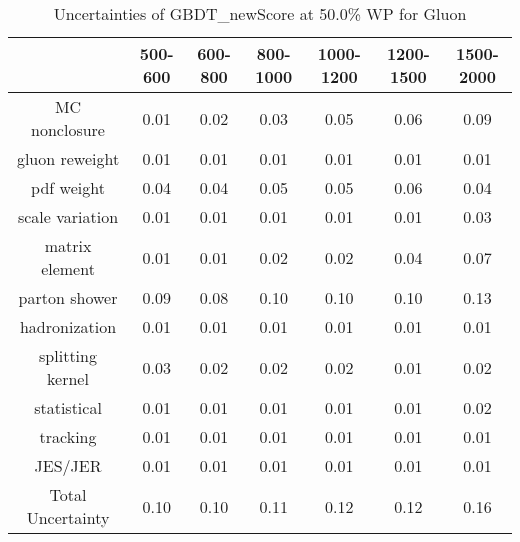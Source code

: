\begin{table}
\centering
\caption{Uncertainties of GBDT_newScore at 50.0\% WP for Gluon}
\label{tab:syst_GBDT_newScore_0.5_Gluon}
\begin{tabular}{ccccccc}
\toprule
{} &  500-600 &  600-800 &  800-1000 &  1000-1200 &  1200-1500 &  1500-2000 \\
\midrule
MC nonclosure     &     0.01 &     0.02 &      0.03 &       0.05 &       0.06 &       0.09 \\
gluon reweight    &     0.01 &     0.01 &      0.01 &       0.01 &       0.01 &       0.01 \\
pdf weight        &     0.04 &     0.04 &      0.05 &       0.05 &       0.06 &       0.04 \\
scale variation   &     0.01 &     0.01 &      0.01 &       0.01 &       0.01 &       0.03 \\
matrix element    &     0.01 &     0.01 &      0.02 &       0.02 &       0.04 &       0.07 \\
parton shower     &     0.09 &     0.08 &      0.10 &       0.10 &       0.10 &       0.13 \\
hadronization     &     0.01 &     0.01 &      0.01 &       0.01 &       0.01 &       0.01 \\
splitting kernel  &     0.03 &     0.02 &      0.02 &       0.02 &       0.01 &       0.02 \\
statistical       &     0.01 &     0.01 &      0.01 &       0.01 &       0.01 &       0.02 \\
tracking          &     0.01 &     0.01 &      0.01 &       0.01 &       0.01 &       0.01 \\
JES/JER           &     0.01 &     0.01 &      0.01 &       0.01 &       0.01 &       0.01 \\
Total Uncertainty &     0.10 &     0.10 &      0.11 &       0.12 &       0.12 &       0.16 \\
\bottomrule
\end{tabular}
\end{table}
